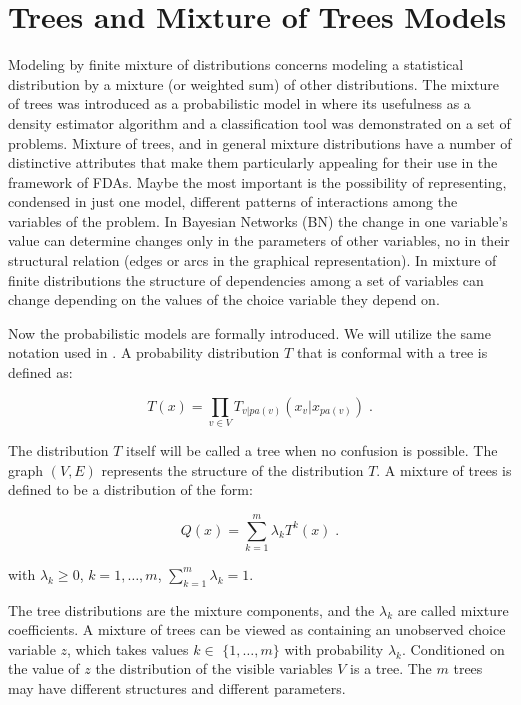 \documentclass[runningheads]{llncs}
\begin{document}
\section{Trees and Mixture of Trees Models} 

 Modeling by finite
mixture of distributions \cite{Everitt_and_Hand:1981} concerns modeling a statistical
distribution by a mixture (or weighted sum) of other distributions. The mixture of
trees  was introduced as a probabilistic model in \cite{Meila:1999} where its
usefulness as a density estimator algorithm and a classification tool was
demonstrated on a set of problems. Mixture of trees, and in general mixture distributions have a number of 
distinctive attributes that make them particularly appealing for their use 
in the framework of FDAs. Maybe the most important is the possibility of 
representing, condensed in just one model, different patterns of 
interactions among the variables of the problem. In Bayesian Networks (BN) the change in one 
variable's value can determine changes only in the parameters of other 
variables, no in their structural relation (edges or arcs in the graphical 
representation). In mixture of finite distributions the structure of 
dependencies among a set of variables can change depending on the values of 
the choice variable they depend on.

 
 Now the probabilistic models are 
formally introduced. We will utilize the same notation used in \cite{Meila:1999}. 
  A probability distribution $T$ that is conformal with a tree is defined as: 
 
\begin{equation} 
   T(x)=\prod_{v\in V} T_{v|pa(v)}( x_v|x_{pa(v)}) \;.  \label{T-Tree} 
\end{equation} 
 
The distribution $T$ itself will be called a tree when no confusion is 
possible. The graph $(V,E)$ represents the structure of the distribution $T$. A mixture of trees is defined to be a distribution of the form:



\begin{equation}
   Q(x)=\sum\limits_{k=1}^m\lambda _kT^k(x) \;  .  \label{Q-Mixture}
\end{equation}

with $\lambda _k\geq 0$, $k=1,\ldots,m$, $\sum_{k=1}^m\lambda _k=1$.


The tree distributions are the mixture components, and the $\lambda _k$ are called
mixture coefficients. A mixture of trees can be viewed as containing an unobserved
choice variable $z$, which takes values $k\in $ $\{1,\ldots,m\}$ with probability
$\lambda _k$. Conditioned on the value of $z$ the distribution of the visible
variables $V$ is a tree. The $m$ trees may have different structures and different parameters.
\end{document}
